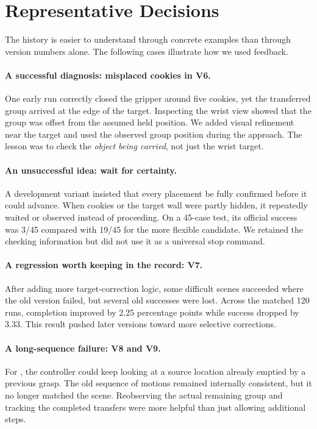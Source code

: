 \section{Representative Decisions}
The history is easier to understand through concrete examples than through version numbers alone. The following cases illustrate how we used feedback.

\paragraph{A successful diagnosis: misplaced cookies in V6.}
One early run correctly closed the gripper around five cookies, yet the transferred group arrived at the edge of the target. Inspecting the wrist view showed that the group was offset from the assumed held position. We added visual refinement near the target and used the observed group position during the approach. The lesson was to check the \emph{object being carried}, not just the wrist target.

\paragraph{An unsuccessful idea: wait for certainty.}
A development variant insisted that every placement be fully confirmed before it could advance. When cookies or the target wall were partly hidden, it repeatedly waited or observed instead of proceeding. On a 45-case test, its official success was 3/45 compared with 19/45 for the more flexible candidate. We retained the checking information but did not use it as a universal stop command.

\paragraph{A regression worth keeping in the record: V7.}
After adding more target-correction logic, some difficult scenes succeeded where the old version failed, but several old successes were lost. Across the matched 120 runs, completion improved by 2.25 percentage points while success dropped by 3.33. This result pushed later versions toward more selective corrections.

\paragraph{A long-sequence failure: V8 and V9.}
For \pTen, the controller could keep looking at a source location already emptied by a previous grasp. The old sequence of motions remained internally consistent, but it no longer matched the scene. Reobserving the actual remaining group and tracking the completed transfers were more helpful than just allowing additional steps.


